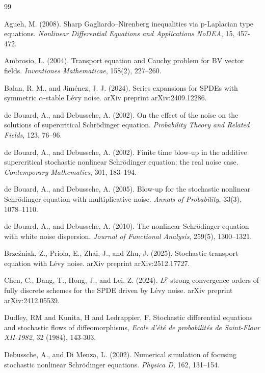 \documentclass[12pt,oneside, reqno]{amsart}
\numberwithin{equation}{section}
\begin{document}
\begin{thebibliography}{99}
	
	 Agueh, M. (2008). Sharp Gagliardo–Nirenberg inequalities via p-Laplacian type equations. {\it Nonlinear Differential Equations and Applications NoDEA}, 15, 457-472.
	
	 Ambrosio, L. (2004). Transport equation and Cauchy problem for BV vector fields. {\it Inventiones Mathematicae}, 158(2), 227–260.
	
	 Balan, R. M., and Jim\'{e}nez, J. J. (2024). Series expansions for SPDEs with symmetric $\alpha$-stable L\'{e}vy noise. arXiv preprint arXiv:2409.12286.
	
	 de Bouard, A., and Debussche, A. (2002). On the effect of the noise on the solutions of supercritical Schrödinger equation. {\it Probability Theory and Related Fields}, 123, 76–96.
	
	 de Bouard, A., and Debussche, A. (2002). Finite time blow-up in the additive supercritical stochastic nonlinear Schrödinger equation: the real noise case. {\it Contemporary Mathematics}, 301, 183–194.
	
	 de Bouard, A., and Debussche, A. (2005). Blow-up for the stochastic nonlinear Schrödinger equation with multiplicative noise. {\it Annals of Probability}, 33(3), 1078–1110.
	
	 de Bouard, A., and Debussche, A. (2010). The nonlinear Schr\"{o}dinger equation with white noise dispersion. {\it Journal of Functional Analysis}, 259(5), 1300–1321.
	
	 Brze\'{z}niak, Z., Priola, E., Zhai, J., and Zhu, J. (2025). Stochastic transport equation with L\'{e}vy noise. arXiv preprint arXiv:2512.17727.
	
	 Chen, C., Dang, T., Hong, J., and Lei, Z. (2024). $L^p$-strong convergence orders of fully discrete schemes for the SPDE driven by L\'{e}vy noise. arXiv preprint arXiv:2412.05539.
	
	 Dudley, RM and Kunita, H and Ledrappier, F, Stochastic differential equations and stochastic flows of diffeomorphisms, {\it Ecole d'{\'e}t{\'e} de probabilit{\'e}s de Saint-Flour XII-1982}, 32 (1984), 143-303.
	
	
	 Debussche, A., and Di Menza, L. (2002). Numerical simulation of focusing stochastic nonlinear Schr\"{o}dinger equations. {\it Physica D}, 162, 131–154.
	

\end{thebibliography}
\end{document}

